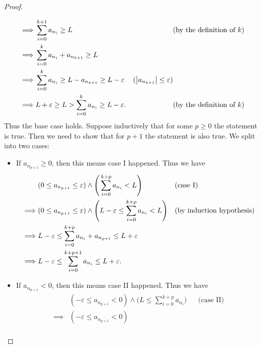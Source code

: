 \begin{proof}
\begin{itemize}
\begin{align*}
			      \implies & \sum_{i = 0}^{k + 1} a_{n_i} \geq L                                   &                                        & \text{(by the definition of \(k\))} \\
			      \implies & \sum_{i = 0}^k a_{n_i} + a_{n_{k + 1}} \geq L                                                                                                        \\
			      \implies & \sum_{i = 0}^k a_{n_i} \geq L - a_{n_{k + 1}} \geq L - \varepsilon    & (\left\lvert a_{n_{k + 1}}\right\rvert \leq \varepsilon)                                       \\
			      \implies & L + \varepsilon \geq L > \sum_{i = 0}^k a_{n_i} \geq L - \varepsilon. &                                        & \text{(by the definition of \(k\))}
		      \end{align*}
		      Thus the base case holds.
		      Suppose inductively that for some \(p \geq 0\) the statement is true.
		      Then we need to show that for \(p + 1\) the statement is also true.
		      We split into two cases:
		      \begin{itemize}
			      \item If \(a_{n_{p + 1}} \geq 0\), then this means case I happened.
			            Thus we have
			            \begin{align*}
				                     & (0 \leq a_{n_{p + 1}} \leq \varepsilon) \land \Bigg(\sum_{i = 0}^{k + p} a_{n_i} < L\Bigg)                      &  & \text{(case I)} \\
				            \implies & (0 \leq a_{n_{p + 1}} \leq \varepsilon) \land \Bigg(L - \varepsilon \leq \sum_{i = 0}^{k + p} a_{n_i} < L\Bigg) &  & \text{(by induction hypothesis)}           \\
				            \implies & L - \varepsilon \leq \sum_{i = 0}^{k + p} a_{n_i} + a_{n_{p + 1}} \leq L + \varepsilon                                               \\
				            \implies & L - \varepsilon \leq \sum_{i = 0}^{k + p + 1} a_{n_i} \leq L + \varepsilon.
			            \end{align*}
			      \item If \(a_{n_{p + 1}} < 0\), then this means case II happened.
			            Thus we have
			            \begin{align*}
				                     & (-\varepsilon \leq a_{n_{p + 1}} < 0) \land \Bigg(L \leq \sum_{i = 0}^{k + p} a_{n_i}\Bigg) &  & \text{(case II)} \\
				            \implies & (-\varepsilon \leq a_{n_{p + 1}} < 0)                                                                             \\

\end{align*}
\end{itemize}
\end{itemize}
\end{proof}
